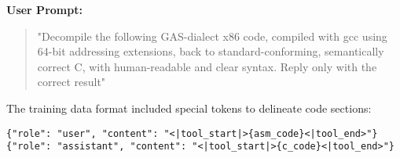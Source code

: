 \documentclass[../main.tex]{subfiles}
\begin{document}
\textbf{User Prompt:}
\begin{quote}
"Decompile the following GAS-dialect x86 code, compiled with gcc using 64-bit addressing extensions, back to standard-conforming, semantically correct C, with human-readable and clear syntax. Reply only with the correct result"
\end{quote}

The training data format included special tokens to delineate code sections:
\begin{verbatim}
{"role": "user", "content": "<|tool_start|>{asm_code}<|tool_end>"}
{"role": "assistant", "content": "<|tool_start|>{c_code}<|tool_end>"}
\end{verbatim}
\end{document}
